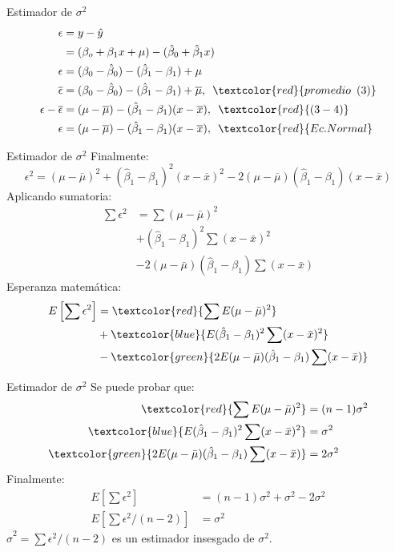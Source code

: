 \begin{frame}{Estimador de $\sigma^{2}$}
	\begin{align}
		\epsilon	& = y - \hat{y}\\
		& = (\beta_{o}+\beta_{1}x+\mu) - (\hat{\beta}_{0}+\hat{\beta}_{1}x)\\
		\epsilon	& = (\beta_{0} - \hat{\beta}_{0}) - (\hat{\beta}_{1} - \beta_{1}) + \mu\\
		\overline{\epsilon}	& = (\beta_{0} - \hat{\beta}_{0}) - (\hat{\beta}_{1} - \beta_{1}) + \overline{\mu},\enskip \textcolor{red}{promedio\enskip (3)}\\
		\epsilon - \overline{\epsilon}	& = (\mu - \overline{\mu}) - (\hat{\beta}_{1} - \beta_{1})(x - \overline{x}),\enskip \textcolor{red}{(3-4)} \\
		\epsilon	& = (\mu - \overline{\mu})- (\hat{\beta}_{1} - \beta_{1})(x - \overline{x}),\enskip \textcolor{red}{Ec. Normal}
	\end{align}
\end{frame}
\begin{frame}{Estimador de $\sigma^{2}$}
	Finalmente:
	$$\epsilon^{2} = (\mu - \overline{\mu})^{2} + (\hat{\beta}_{1} - \beta_{1})^{2}(x - \overline{x})^{2}-2(\mu - \overline{\mu})(\hat{\beta}_{1} - \beta_{1})(x - \overline{x})$$
	Aplicando sumatoria:
	\begin{align*}
		\sum\epsilon^2	& = \sum(\mu-\bar\mu)^2 \\
		&  +(\hat\beta_1 -\beta_1)^2\sum(x-\bar x)^2\\
		&  -2 (\mu-\bar\mu)(\hat\beta_1 -\beta_1)\sum(x-\bar x)
	\end{align*}
	Esperanza matemática:
	\begin{align*}
		E\left[\sum\epsilon^2\right]	&=\textcolor{red}{\sum E(\mu-\bar\mu)^2} \\
		&+ \textcolor{blue}{E(\hat\beta_1 -\beta_1)^2\sum(x-\bar x)^2}\\
		&-\textcolor{green}{2 E(\mu-\bar\mu)(\hat\beta_1 -\beta_1)\sum(x-\bar x)} 
	\end{align*}
\end{frame}
\begin{frame}{Estimador de $\sigma^{2}$}
	Se puede probar que:
	\begin{align*}
		\textcolor{red}{\sum E (\mu-\bar\mu)^2} & = (n-1)\sigma^2 \\
		\textcolor{blue}{E(\hat\beta_1 -\beta_1)^2\sum(x-\bar x)^2} & = \sigma^2 \\
		\textcolor{green}{2 E(\mu-\bar\mu)(\hat\beta_1 -\beta_1)\sum(x-\bar x)} & =  2\sigma^2 
	\end{align*}
	Finalmente:
	\begin{align*}
		E\left[\sum\epsilon^2\right] &= (n-1)\sigma^2 +  \sigma^2 -2\sigma^2  \\
		E\left[\sum\epsilon^2/(n-2) \right] &= \sigma^2 
	\end{align*}
	$\hat\sigma^2=\sum\epsilon^2/(n-2)$ es un estimador insesgado de $\sigma^2$.
\end{frame}
